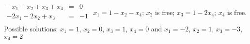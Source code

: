 {$\begin{array}{rcl}
-x_1-x_2+x_3+x_4&=&0\\
-2x_1-2x_2+x_3&=&-1\\
\end{array}$}
{$x_1=1-x_2-x_4$; $x_2$ is free; $x_3=1-2x_4$; $x_4$ is free. Possible solutions: $x_1 = 1$, $x_2 = 0$, $x_3 = 1$, $x_4 = 0$ and $x_1 = -2$, $x_2 = 1$, $x_3 = -3$, $x_4=2$ }